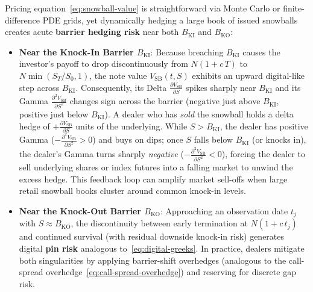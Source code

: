 Pricing equation~\eqref{eq:snowball-value} is straightforward via Monte Carlo or finite-difference PDE grids, yet dynamically hedging a large book of issued snowballs creates acute \textbf{barrier hedging risk} near both $B_{\mathrm{KI}}$ and $B_{\mathrm{KO}}$:
\begin{itemize}
    \item \textbf{Near the Knock-In Barrier $B_{\mathrm{KI}}$}: Because breaching $B_{\mathrm{KI}}$ causes the investor's payoff to drop discontinuously from $N(1 + c\,T)$ to $N\min(S_T / S_0, 1)$, the note value $V_{\mathrm{SB}}(t, S)$ exhibits an upward digital-like step across $B_{\mathrm{KI}}$. Consequently, its Delta $\frac{\partial V_{\mathrm{SB}}}{\partial S}$ spikes sharply near $B_{\mathrm{KI}}$ and its Gamma $\frac{\partial^2 V_{\mathrm{SB}}}{\partial S^2}$ changes sign across the barrier (negative just above $B_{\mathrm{KI}}$, positive just below $B_{\mathrm{KI}}$). A dealer who has \emph{sold} the snowball holds a delta hedge of $+\frac{\partial V_{\mathrm{SB}}}{\partial S}$ units of the underlying. While $S > B_{\mathrm{KI}}$, the dealer has positive Gamma ($-\frac{\partial^2 V_{\mathrm{SB}}}{\partial S^2} > 0$) and buys on dips; once $S$ falls below $B_{\mathrm{KI}}$ (or knocks in), the dealer's Gamma turns sharply \emph{negative} ($-\frac{\partial^2 V_{\mathrm{SB}}}{\partial S^2} < 0$), forcing the dealer to sell underlying shares or index futures into a falling market to unwind the excess hedge. This feedback loop can amplify market sell-offs when large retail snowball books cluster around common knock-in levels.
    \item \textbf{Near the Knock-Out Barrier $B_{\mathrm{KO}}$}: Approaching an observation date $t_j$ with $S \approx B_{\mathrm{KO}}$, the discontinuity between early termination at $N(1 + c\,t_j)$ and continued survival (with residual downside knock-in risk) generates digital \textbf{pin risk} analogous to~\eqref{eq:digital-greeks}. In practice, dealers mitigate both singularities by applying barrier-shift overhedges (analogous to the call-spread overhedge~\eqref{eq:call-spread-overhedge}) and reserving for discrete gap risk.
\end{itemize}

